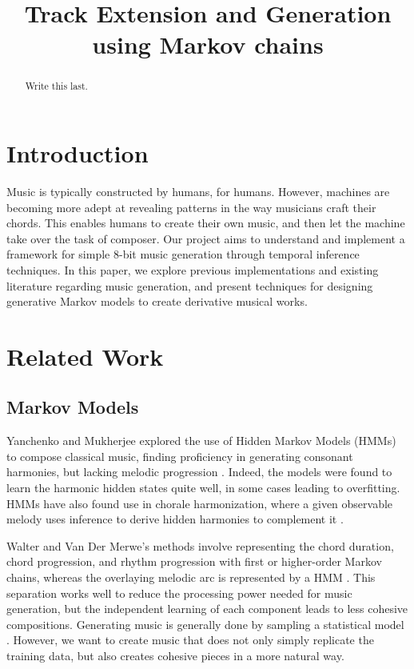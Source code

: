 \documentclass{article}
\title{Track Extension and Generation using Markov chains}
\begin{document}
\maketitle

\begin{abstract}
Write this last.
\end{abstract}

\section{Introduction}
Music is typically constructed by humans, for humans. However, machines are becoming more adept at revealing patterns in the way musicians craft their chords. 
This enables humans to create their own music, and then let the machine take over the task of composer. Our project aims to understand and implement a framework 
for simple 8-bit music generation through temporal inference techniques. In this paper, we explore previous implementations and existing literature regarding music 
generation, and present techniques for designing generative Markov models to create derivative musical works.

\section{Related Work}
\subsection{Markov Models}
Yanchenko and Mukherjee explored the use of Hidden Markov Models (HMMs) to compose classical music, finding proficiency in generating consonant harmonies, but 
lacking melodic progression \cite{yanchenko_2017}. Indeed, the models were found to learn the harmonic hidden states quite well, in some cases leading to overfitting. 
HMMs have also found use in chorale harmonization, where a given observable melody uses inference to derive hidden harmonies to complement it \cite{allan_2005}. 

Walter and Van Der Merwe's methods involve representing the chord duration, chord progression, and rhythm progression with first or higher-order Markov chains, whereas 
the overlaying melodic arc is represented by a HMM \cite{walter_2011}. This separation works well to reduce the processing power needed for music generation, but the 
independent learning of each component leads to less cohesive compositions. Generating music is generally done by sampling a statistical model \cite{conklin_2003}.
However, we want to create music that does not only simply replicate the training data, but also creates cohesive pieces in a more natural way. 
\end{document}
